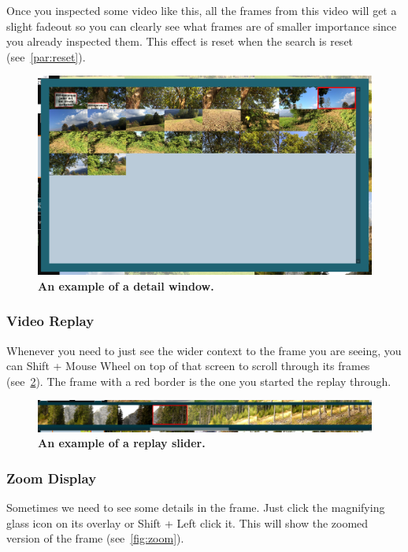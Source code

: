 Once you inspected some video like this, all the frames from this video will get a slight fadeout so you can clearly see what frames are of smaller importance since you already inspected them. This effect is reset when the search is reset (see~\cref{par:reset}).

\begin{figure}[h]
	\centering
	\includegraphics[width=1.0\textwidth]{img/detail-window.png}
  \caption{\textbf{An example of a detail window.}}
	\label{fig:detail-window}
\end{figure}

\subsubsection{Video Replay}
Whenever you need to just see the wider context to the frame you are seeing, you can Shift + Mouse Wheel on top of that screen to scroll through its frames (see~\cref{fig:replay-overlay}). The frame with a red border is the one you started the replay through.

\begin{figure}[h]
	\centering
	\includegraphics[width=1.0\textwidth]{img/replay-overlay.png}
  \caption{\textbf{An example of a replay slider.}}
	\label{fig:replay-overlay}
\end{figure}

\subsubsection{Zoom Display}
Sometimes we need to see some details in the frame. Just click the magnifying glass icon on its overlay or Shift + Left click it. This will show the zoomed version of the frame (see~\cref{fig:zoom}).

